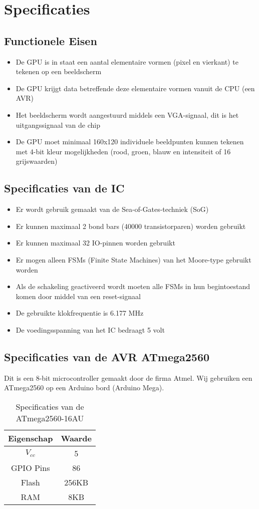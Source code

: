 \documentclass{scrreprt} %
\date{22 november 2013}
\begin{document}
\chapter{Specificaties}
\section {Functionele Eisen}
\begin {itemize}
\item De GPU is in staat een aantal elementaire vormen (pixel en vierkant) te tekenen op een beeldscherm
\item De GPU krijgt data betreffende deze elementaire vormen vanuit de CPU (een AVR)
\item Het beeldscherm wordt aangestuurd middels een VGA-signaal, dit is het uitgangssignaal van de chip
\item De GPU moet minimaal 160x120 individuele beeldpunten kunnen tekenen met 4-bit kleur mogelijkheden (rood, groen, blauw en intensiteit of 16 grijswaarden)
\end{itemize}

\section {Specificaties van de IC}
\begin {itemize}
\item Er wordt gebruik gemaakt van de Sea-of-Gates-techniek (SoG)
\item Er kunnen maximaal 2 bond bars (40000 transistorparen) worden gebruikt
\item Er kunnen maximaal 32 IO-pinnen worden gebruikt
\item Er mogen alleen FSMs (Finite State Machines) van het Moore-type gebruikt worden
\item Als de schakeling geactiveerd wordt moeten alle FSMs in hun begintoestand komen door middel van een reset-signaal
\item De gebruikte klokfrequentie is 6.177 MHz
\item De voedingsspanning van het IC bedraagt 5 volt
\end{itemize}

\section {Specificaties van de AVR ATmega2560}
Dit is een 8-bit microcontroller gemaakt door de firma Atmel. Wij gebruiken een ATmega2560 op een Arduino bord (Arduino Mega).
\begin{table}[H]
\centering
\caption{Specificaties van de ATmega2560-16AU}
\label{tab:spec-avr}
\begin{tabular}{c c}
	\hline\hline
 	Eigenschap & Waarde\\
 	\hline
	$V_{cc}$ & 5\volt \\
	GPIO Pins & 86 \\
	Flash & 256KB \\
	RAM & 8KB \\
  	\hline
\end{tabular}
\end{table}
\end{document}
